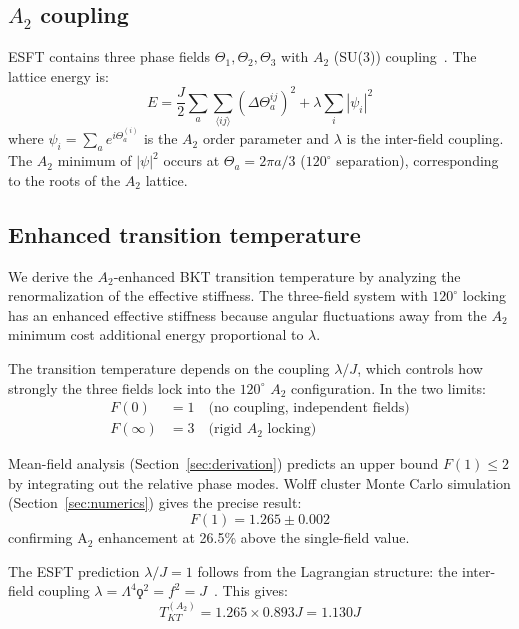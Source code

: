 ﻿\documentclass[twocolumn,showpacs,preprintnumbers,amsmath,amssymb,prd]{revtex4-2}
\begin{document}
\subsection{$A_2$ coupling}

ESFT contains three phase fields $\Theta_1, \Theta_2, \Theta_3$ with $A_2$ (SU(3)) coupling~\cite{Paper2}. The lattice energy is:
\begin{equation}
E = \frac{J}{2}\sum_a \sum_{\langle ij \rangle} (\Delta\Theta_a^{ij})^2 + \lambda \sum_i |\psi_i|^2
\label{eq:energy}
\end{equation}
where $\psi_i = \sum_a e^{i\Theta_a^{(i)}}$ is the $A_2$ order parameter and $\lambda$ is the inter-field coupling. The $A_2$ minimum of $|\psi|^2$ occurs at $\Theta_a = 2\pi a/3$ ($120^\circ$ separation), corresponding to the roots of the $A_2$ lattice.

\subsection{Enhanced transition temperature}

We derive the $A_2$-enhanced BKT transition temperature by analyzing the renormalization of the effective stiffness. The three-field system with $120^\circ$ locking has an enhanced effective stiffness because angular fluctuations away from the $A_2$ minimum cost additional energy proportional to $\lambda$.

The transition temperature depends on the coupling $\lambda/J$, which controls how strongly the three fields lock into the $120^\circ$ $A_2$ configuration. In the two limits:
\begin{align}
F(0) &= 1 \quad \text{(no coupling, independent fields)} \\
F(\infty) &= 3 \quad \text{(rigid $A_2$ locking)}
\end{align}

Mean-field analysis (Section~\ref{sec:derivation}) predicts an upper bound $F(1) \leq 2$ by integrating out the relative phase modes. Wolff cluster Monte Carlo simulation (Section~\ref{sec:numerics}) gives the precise result:
\begin{equation}
\boxed{F(1) = 1.265 \pm 0.002}
\label{eq:F_MC}
\end{equation}
confirming A$_2$ enhancement at 26.5\% above the single-field value.

The ESFT prediction $\lambda/J = 1$ follows from the Lagrangian structure: the inter-field coupling $\lambda = \Lambda^4 \koppa^2 = f^2 = J$~\cite{Paper2}. This gives:
\begin{equation}
T_{KT}^{(A_2)} = 1.265 \times 0.893 J = 1.130 J
\end{equation}
\end{document}
